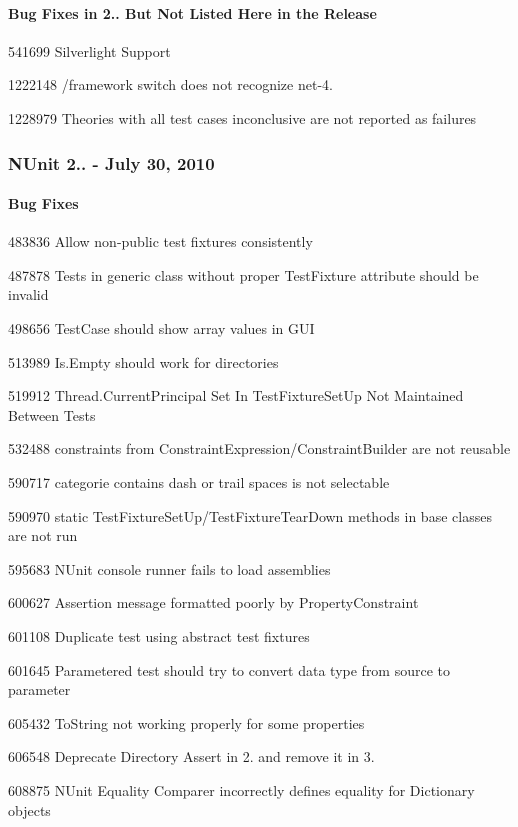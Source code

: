 \paragraph*{Bug Fixes in 2.. But Not Listed Here in the Release}


\begin{DoxyItemize}
\item 541699 Silverlight Support
\item 1222148 /framework switch does not recognize net-\/4.
\item 1228979 Theories with all test cases inconclusive are not reported as failures
\end{DoxyItemize}

\subsubsection*{N\+Unit 2.. -\/ July 30, 2010}

\paragraph*{Bug Fixes}


\begin{DoxyItemize}
\item 483836 Allow non-\/public test fixtures consistently
\item 487878 Tests in generic class without proper Test\+Fixture attribute should be invalid
\item 498656 Test\+Case should show array values in G\+UI
\item 513989 Is.\+Empty should work for directories
\item 519912 Thread.\+Current\+Principal Set In Test\+Fixture\+Set\+Up Not Maintained Between Tests
\item 532488 constraints from Constraint\+Expression/\+Constraint\+Builder are not reusable
\item 590717 categorie contains dash or trail spaces is not selectable
\item 590970 static Test\+Fixture\+Set\+Up/\+Test\+Fixture\+Tear\+Down methods in base classes are not run
\item 595683 N\+Unit console runner fails to load assemblies
\item 600627 Assertion message formatted poorly by Property\+Constraint
\item 601108 Duplicate test using abstract test fixtures
\item 601645 Parametered test should try to convert data type from source to parameter
\item 605432 To\+String not working properly for some properties
\item 606548 Deprecate Directory Assert in 2. and remove it in 3.
\item 608875 N\+Unit Equality Comparer incorrectly defines equality for Dictionary objects
\end{DoxyItemize}


